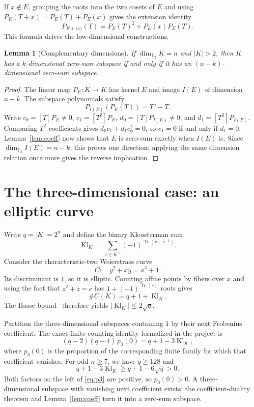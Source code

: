 \documentclass[11pt]{amsart}
\numberwithin{equation}{section}
\newtheorem{lemma}[theorem]{Lemma}
\theoremstyle{definition}
\theoremstyle{remark}
\newcommand{\Ftwo}{\mathbb F_2}
\newcommand{\tr}{\operatorname{Tr}}
\newcommand{\dimf}{\dim_{\Ftwo}}
\begin{document}
If $x\notin E$, grouping the roots into the two cosets of $E$ and using $P_E(T+x)=P_E(T)+P_E(x)$ gives the extension identity
\begin{equation}\label{eq:extension}
 P_{E+\langle x\rangle}(T)=P_E(T)^2+P_E(x)P_E(T).
\end{equation}
This formula drives the low-dimensional constructions.

\begin{lemma}[Complementary dimensions]\label{lem:complement}
If $\dimf K=n$ and $|K|>2$, then $K$ has a $k$-dimensional zero-sum subspace if and only if it has an $(n-k)$-dimensional zero-sum subspace.
\end{lemma}
\begin{proof}
The linear map $P_E:K\to K$ has kernel $E$ and image $I(E)$ of dimension $n-k$. The subspace polynomials satisfy
\[
 P_{I(E)}(P_E(T))=T^q-T.
\]
Write $c_0=[T]P_E\ne0$, $c_1=[T^2]P_E$, $d_0=[T]P_{I(E)}\ne0$, and $d_1=[T^2]P_{I(E)}$. Comparing $T^2$ coefficients gives $d_0c_1+d_1c_0^2=0$, so $c_1=0$ if and only if $d_1=0$. Lemma~\ref{lem:coeff} now shows that $E$ is zero-sum exactly when $I(E)$ is. Since $\dimf I(E)=n-k$, this proves one direction; applying the same dimension relation once more gives the reverse implication.
\end{proof}

\section{The three-dimensional case: an elliptic curve}

Write $q=|K|=2^n$ and define the binary Kloosterman sum
\[
 \operatorname{Kl}_K=\sum_{v\in K^\times}(-1)^{\tr(v+v^{-1})}.
\]
Consider the characteristic-two Weierstrass curve
\[
 C:\quad y^2+xy=x^3+1.
\]
Its discriminant is $1$, so it is elliptic. Counting affine points by fibers over $x$ and using the fact that $z^2+z=c$ has $1+(-1)^{\tr(c)}$ roots gives
\[
 \#C(K)=q+1+\operatorname{Kl}_K.
\]
The Hasse bound~\cite{Silverman} therefore yields $|\operatorname{Kl}_K|\le2\sqrt q$.

Partition the three-dimensional subspaces containing $1$ by their next Frobenius coefficient. The exact finite counting identity formalized in the project is
\begin{equation}\label{eq:p3}
 (q-2)(q-4)\,p_3(0)=q+1-3\operatorname{Kl}_K,
\end{equation}
where $p_3(0)$ is the proportion of the corresponding finite family for which that coefficient vanishes. For odd $n\ge7$, we have $q\ge128$ and
\[
 q+1-3\operatorname{Kl}_K\ge q+1-6\sqrt q>0.
\]
Both factors on the left of \eqref{eq:p3} are positive, so $p_3(0)>0$. A three-dimensional subspace with vanishing next coefficient exists; the coefficient-duality theorem and Lemma~\ref{lem:coeff} turn it into a zero-sum subspace.
\end{document}
